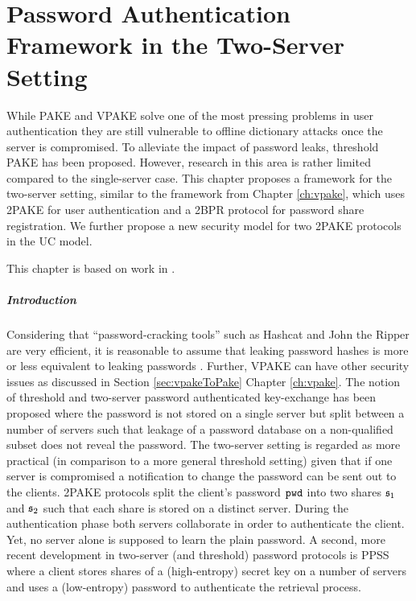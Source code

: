 \chapter{Password Authentication Framework in the Two-Server Setting} \label{ch:2pake}

While \ac{PAKE} and \ac{VPAKE} solve one of the most pressing problems in user authentication they are still vulnerable to offline dictionary attacks once the server is compromised.
To alleviate the impact of password leaks, threshold \ac{PAKE} has been proposed.
However, research in this area is rather limited compared to the single-server case.
This chapter proposes a framework for the two-server setting, similar to the framework from Chapter \ref{ch:vpake}, which uses \ac{2PAKE} for user authentication and a \ac{2BPR} protocol for password share registration.
We further propose a new security model for two \ac{2PAKE} protocols in the \ac{UC} model.

\smallskip
\noindent
This chapter is based on work in \cite{KieferM14b,KieferM15b,KieferM15c}.

\paragraph{Introduction}

Considering that ``password-cracking tools'' such as Hashcat \cite{hashcat} and John the Ripper \cite{JohnTheRipper} are very efficient, it is reasonable to assume that leaking password hashes is more or less equivalent to leaking passwords \cite{NarayananS05a,WeirAMG09,DellAmicoMR10,Bonneau12}.
Further, \ac{VPAKE} can have other security issues as discussed in Section \ref{sec:vpakeToPake} Chapter \ref{ch:vpake}.
The notion of threshold and two-server password authenticated key-exchange \cite{FordK00,MacKenzieSJ02} has been proposed where the password is not stored on a single server but split between a number of servers such that leakage of a password database on a non-qualified subset does not reveal the password.
The two-server setting is regarded as more practical (in comparison to a more general threshold setting) given that if one server is compromised a notification to change the password can be sent out to the clients.
\ac{2PAKE} protocols \cite{BrainardJKS03,SzydloK05,Katz2012a} split the client's password $\mathtt{pwd}$ into two shares $\mathfrak{s}_1$ and $\mathfrak{s}_2$ such that each share is stored on a distinct server.
During the authentication phase both servers collaborate in order to authenticate the client.
Yet, no server alone is supposed to learn the plain password.
A second, more recent development in two-server (and threshold) password protocols is \ac{PPSS} \cite{Bagherzandi2011,Camenisch2012,JareckiKK14} where a client stores shares of a (high-entropy) secret key on a number of servers and uses a (low-entropy) password to authenticate the retrieval process.

